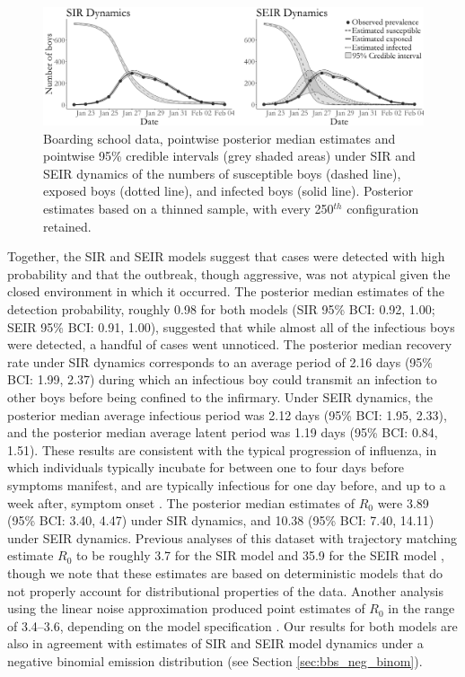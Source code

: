 \begin{figure}[ht!]
	\centering
	\includegraphics[width=\linewidth]{figures/bbs_latent_posts.pdf}
	\caption[Boarding school data and latent posterior under SIR and SEIR dynamics.]{Boarding school data, pointwise posterior median estimates and pointwise 95\% credible intervals (grey shaded areas) under SIR and SEIR dynamics of the numbers of susceptible boys (dashed line), exposed boys (dotted line), and infected boys (solid line). Posterior estimates based on a thinned sample, with every 250$ ^{th} $ configuration retained.}
	\label{fig:bbs_dat}
\end{figure}

Together, the SIR and SEIR models suggest that cases were detected with high probability and that the outbreak, though aggressive, was not atypical given the closed environment in which it occurred. The posterior median estimates of the detection probability, roughly 0.98 for both models (SIR 95\% BCI: 0.92, 1.00; SEIR 95\% BCI: 0.91, 1.00), suggested that while almost all of the infectious boys were detected, a handful of cases went unnoticed. The posterior median recovery rate under SIR dynamics corresponds to an average period of 2.16 days (95\% BCI: 1.99, 2.37) during which an infectious boy could transmit an infection to other boys before being confined to the infirmary. Under SEIR dynamics, the posterior median average infectious period was 2.12 days (95\% BCI: 1.95, 2.33), and the posterior median average latent period was 1.19 days (95\% BCI: 0.84, 1.51). These results are consistent with the typical progression of influenza, in which individuals typically incubate for between one to four days before symptoms manifest, and are typically infectious for one day before, and up to a week after, symptom onset \citep{cdcFlu}. The posterior median estimates of $ R_0 $ were 3.89 (95\% BCI: 3.40, 4.47) under SIR dynamics, and 10.38 (95\% BCI: 7.40, 14.11) under SEIR dynamics. Previous analyses of this dataset with trajectory matching estimate $ R_0 $ to be roughly 3.7 for the SIR model and 35.9 for the SEIR model \citep{wearing2005, keeling2008}, though we note that these estimates are based on deterministic models that do not properly account for distributional properties of the data. Another analysis using the linear noise approximation produced point estimates of $ R_0 $ in the range of 3.4--3.6, depending on the model specification \cite{ross2009parameter}. Our results for both models are also in agreement with estimates of SIR and SEIR model dynamics under a negative binomial emission distribution (see Section \ref{sec:bbs_neg_binom}).

